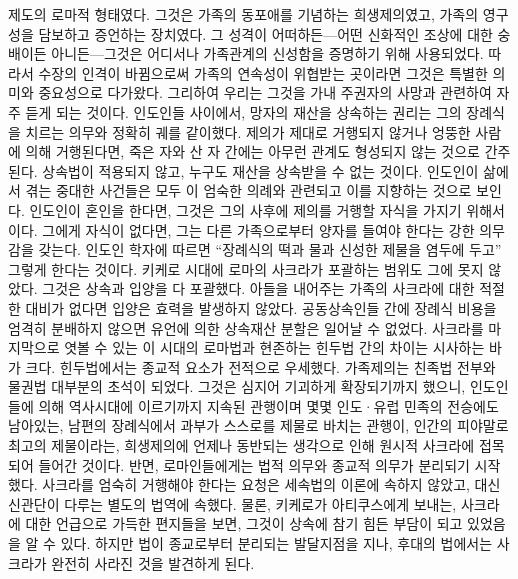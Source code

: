 제도의 로마적 형태였다.
그것은 가족의 동포애를 기념하는 희생제의였고,
가족의 영구성을 담보하고 증언하는 장치였다.
그 성격이 어떠하든---어떤 신화적인 조상에 대한 숭배이든 아니든---그것은
어디서나 가족관계의 신성함을 증명하기 위해 사용되었다.
따라서 수장의 인격이 바뀜으로써 가족의 연속성이 위협받는 곳이라면
그것은 특별한 의미와 중요성으로 다가왔다.
그리하여 우리는 그것을 가내 주권자의 사망과 관련하여 자주 듣게 되는 것이다.
인도인들 사이에서, 망자의 재산을 상속하는 권리는 그의 장례식을 치르는 의무와
정확히 궤를 같이했다.
제의가 제대로 거행되지 않거나 엉뚱한 사람에 의해 거행된다면,
죽은 자와 산 자 간에는 아무런 관계도 형성되지 않는 것으로 간주된다.
상속법이 적용되지 않고, 누구도 재산을 상속받을 수 없는 것이다.
인도인이 삶에서 겪는 중대한 사건들은 모두 이 엄숙한 의례와 관련되고 이를
지향하는 것으로 보인다.
인도인이 혼인을 한다면, 그것은
그의 사후에 제의를 거행할 자식을 가지기 위해서이다.
그에게 자식이 없다면,
그는 다른 가족으로부터 양자를 들여야 한다는 강한 의무감을 갖는다.
인도인 학자에 따르면 ``장례식의 떡과 물과 신성한 제물을 염두에 두고''
그렇게 한다는 것이다.
키케로 시대에 로마의 사크라가 포괄하는 범위도 그에 못지 않았다.
그것은 상속과 입양을 다 포괄했다.
아들을 내어주는 가족의 사크라에 대한 적절한 대비가 없다면
입양은 효력을 발생하지 않았다.
공동상속인들 간에 장례식 비용을 엄격히 분배하지 않으면
유언에 의한 상속재산 분할은 일어날 수 없었다.
사크라를 마지막으로 엿볼 수 있는
이 시대의 로마법과 현존하는 힌두법 간의 차이는
시사하는 바가 크다.
힌두법에서는 종교적 요소가 전적으로 우세했다.
가족제의는 친족법 전부와 물권법 대부분의 초석이 되었다.
그것은 심지어 기괴하게 확장되기까지 했으니,
인도인들에 의해 역사시대에 이르기까지 지속된 관행이며
몇몇 인도^^b7유럽 민족의 전승에도 남아있는,
남편의 장례식에서 과부가 스스로를 제물로 바치는 관행이,
인간의 피야말로 최고의 제물이라는, 희생제의에 언제나 동반되는 생각으로 인해
원시적 사크라에 접목되어 들어간 것이다.
반면, 로마인들에게는 법적 의무와 종교적 의무가 분리되기 시작했다.
사크라를 엄숙히 거행해야 한다는 요청은 세속법의 이론에 속하지 않았고,
대신 신관단이 다루는
별도의 법역에 속했다.
물론,
키케로가 아티쿠스에게 보내는,
사크라에 대한 언급으로 가득한
편지들을 보면, 그것이 상속에 참기 힘든 부담이 되고 있었음을 알 수 있다.
하지만 법이 종교로부터 분리되는 발달지점을 지나,
후대의 법에서는 사크라가 완전히 사라진 것을 발견하게 된다.

